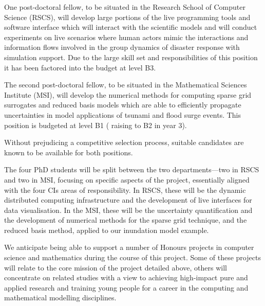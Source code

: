 One post-doctoral fellow, to be situated in the
Research School of Computer Science (RSCS), will develop large
portions of the live programming tools and software interface which
will interact with the scientific models and will conduct experiments
on live scenarios where human actors mimic the interactions and
information flows involved in the group dynamics of disaster response
with simulation support. Due to the large skill set and responsibilities of 
this position it has been factored into the budget at level B3.

The second post-doctoral fellow, to be
situated in the Mathematical Sciences Institute (MSI), will develop
the numerical methods for computing sparse grid surrogates and reduced
basis models which are able to efficiently propagate uncertainties in
model applications of tsunami and flood surge events. This 
position is budgeted at level B1 ( raising to B2 in year 3). 

Without prejudicing a competitive selection process, suitable candidates 
are known to be available for both positions.

The four PhD students will be split between the two departments---two
in RSCS and two in MSI, focusing on specific aspects of the project,
essentially aligned with the four CIs areas of responsibility.  In
RSCS, these will be the dynamic distributed computing infrastructure
and the development of live interfaces for data visualisation. In the
MSI, these will be the uncertainty quantification and the development
of numerical methods for the sparse grid technique, and the reduced
basis method, applied to our inundation model example.

We anticipate being able to support a number of Honours projects in
computer science and mathematics during the course of this
project. Some of these projects will relate to the core mission of the
project detailed above, others will concentrate on related studies
with a view to achieving high-impact pure and applied research and
training young people for a career in the computing and mathematical
modelling disciplines.

